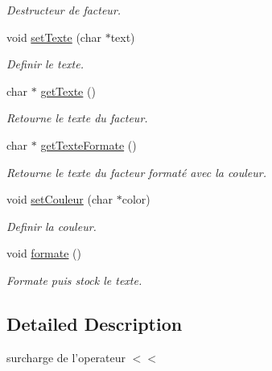 \begin{DoxyCompactItemize}
\begin{DoxyCompactList}\small\item\em Destructeur de facteur. \end{DoxyCompactList}\item 
void \hyperlink{class_facteur_aa83b5bd6563b1f2cab21dddd90fc6666}{set\-Texte} (char $\ast$text)
\begin{DoxyCompactList}\small\item\em Definir le texte. \end{DoxyCompactList}\item 
char $\ast$ \hyperlink{class_facteur_afb04776df3a588d1d52a227854ab37a1}{get\-Texte} ()
\begin{DoxyCompactList}\small\item\em Retourne le texte du facteur. \end{DoxyCompactList}\item 
char $\ast$ \hyperlink{class_facteur_a887bb35c1fdff90040c91716abd15d62}{get\-Texte\-Formate} ()
\begin{DoxyCompactList}\small\item\em Retourne le texte du facteur formaté avec la couleur. \end{DoxyCompactList}\item 
void \hyperlink{class_facteur_ad17a1b26444aee5f6a474296c47c134a}{set\-Couleur} (char $\ast$color)
\begin{DoxyCompactList}\small\item\em Definir la couleur. \end{DoxyCompactList}\item 
\hypertarget{class_facteur_a16f36a57adf914658c50fbd527f2e2b8}{void \hyperlink{class_facteur_a16f36a57adf914658c50fbd527f2e2b8}{formate} ()}\label{class_facteur_a16f36a57adf914658c50fbd527f2e2b8}

\begin{DoxyCompactList}\small\item\em Formate puis stock le texte. \end{DoxyCompactList}\end{DoxyCompactItemize}


\subsection{Detailed Description}
surcharge de l'operateur $<$$<$ 

